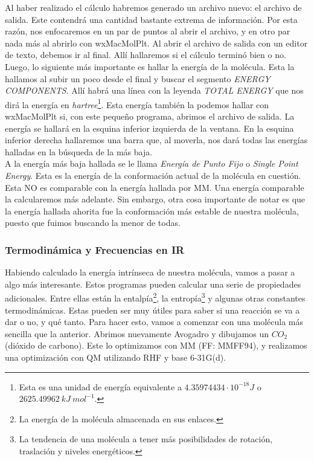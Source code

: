\documentclass[10pt,letterpaper]{article}
\begin{document}
Al haber realizado el c\'alculo habremos generado un archivo nuevo: el archivo de salida. Este contendr\'a una cantidad bastante extrema de informaci\'on. Por esta raz\'on, nos enfocaremos en un par de puntos al abrir el archivo, y en otro par nada m\'as al abrirlo con wxMacMolPlt. Al abrir el archivo de salida con un editor de texto, debemos ir al final. All\'i hallaremos si el c\'alculo termin\'o bien o no. Luego, lo siguiente m\'as importante es hallar la energ\'ia de la mol\'ecula. Esta la hallamos al subir un poco desde el final y buscar el segmento \textit{ENERGY COMPONENTS}. All\'i habr\'a una l\'inea con la leyenda \textit{TOTAL ENERGY} que nos dir\'a la energ\'ia en \emph{hartree}\footnote{Esta es una unidad de energ\'ia equivalente a $4.35974434 \cdot 10^{-18} J$ o $2625.49962\ kJ\ mol^{-1}$.}. Esta energ\'ia tambi\'en la podemos hallar con wxMacMolPlt si, con este peque\~no programa, abrimos el archivo de salida. La energ\'ia se hallar\'a en la esquina inferior izquierda de la ventana. En la esquina inferior derecha hallaremos una barra que, al moverla, nos dar\'a todas las energ\'ias halladas en la b\'usqueda de la m\'as baja.\\

A la energ\'ia m\'as baja hallada se le llama \emph{Energ\'ia de Punto Fijo} o \emph{Single Point Energy}. Esta es la energ\'ia de la conformaci\'on actual de la mol\'ecula en cuesti\'on. Esta NO es comparable con la energ\'ia hallada por MM. Una energ\'ia comparable la calcularemos m\'as adelante. Sin embargo, otra cosa importante de notar es que la energ\'ia hallada ahorita fue la conformaci\'on m\'as estable de nuestra mol\'ecula, puesto que fuimos buscando la menor de todas.

\subsubsection{Termodin\'amica y Frecuencias en IR}
Habiendo calculado la energ\'ia intr\'inseca de nuestra mol\'ecula, vamos a pasar a algo m\'as interesante. Estos programas pueden calcular una serie de propiedades adicionales. Entre ellas est\'an la entalp\'ia\footnote{La energ\'ia de la mol\'ecula almacenada en sus enlaces.}, la entrop\'ia\footnote{La tendencia de una mol\'ecula a tener m\'as posibilidades de rotaci\'on, traslaci\'on y niveles energ\'eticos.} y algunas otras constantes termodin\'amicas. Estas pueden ser muy \'utiles para saber si una reacci\'on se va a dar o no, y qu\'e tanto. Para hacer esto, vamos a comenzar con una mol\'ecula m\'as sencilla que la anterior. Abrimos nuevamente Avogadro y dibujamos un $CO_2$ (di\'oxido de carbono). Este lo optimizamos con MM (FF: MMFF94), y realizamos una optimizaci\'on con QM utilizando RHF y base 6-31G(d).\\
\end{document}
